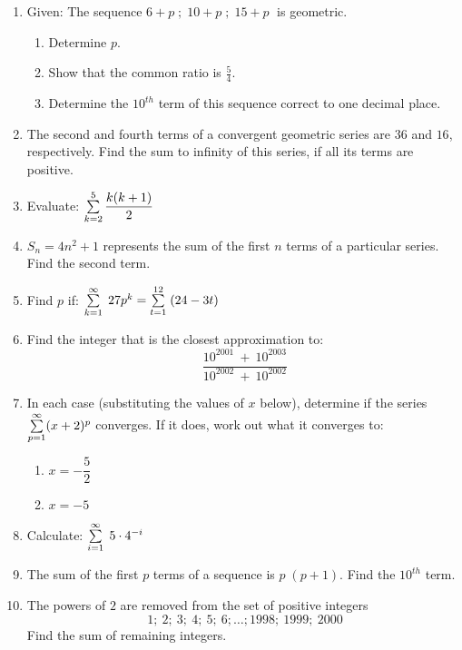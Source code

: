 \begin{enumerate}
\item{Given: The sequence $6+p \;\!; \; 10+p\;\!; \; 15+p \;$ is geometric.}
\begin{enumerate}
\item{Determine $p$.}
\item{Show that the common ratio is $\tfrac{5}{4}$.}
\item{Determine the $10^{th}$ term of this sequence correct to one decimal place.}
\end{enumerate}

\item{The second and fourth terms of a convergent geometric series are $36$ and $16$, respectively. Find the sum to infinity of this series, if all its terms are positive.}

\item{Evaluate: $\sum_{k=2}^5 \limits \dfrac{k(k+1)}{2}$}

\item{$S_n = 4n^2 + 1$ represents the sum of the first $n$ terms of a particular series. Find the second term.}

\item{Find $p$ if: \qquad $\sum_{k=1}^{\infty} \limits \; 27p^{ k} = \sum_{t=1}^{12} \limits \; (24-3t)$}

\item{Find the integer that is the closest approximation to:$$\dfrac{10^{ 2001} \:+\: 10^{ 2003}}{10^{ 2002} \:+\: 10^{ 2002}}$$}


\item{In each case (substituting the values of $x$ below), determine if the series $\sum_{p=1}^{\infty} \limits (x+2)^p$ converges. If it does, work out what it converges to:}\begin{enumerate}
\item{$x=-\dfrac{5}{2}$}
\item{$x=-5$}
\end{enumerate}

\item{Calculate: \qquad $\sum_{i=1}^{\infty} \limits \; 5 \cdot 4^{-i}$}

\item{The sum of the first $p$ terms of a sequence is $p \; (p+1)$. Find the $10^{th}$ term.}

\item{The powers of $2$ are removed from the set of positive integers $$1; \: 2; \: 3; \: 4; \: 5; \: 6; \ldots; 1998; \: 1999; \: 2000$$ Find the sum of remaining integers.}


\end{enumerate}
